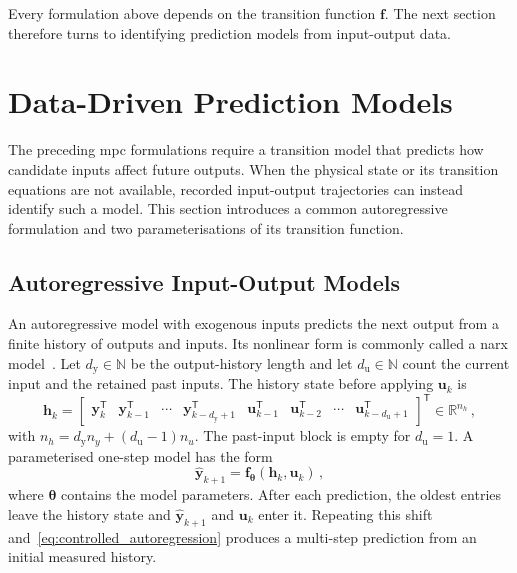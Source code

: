 Every formulation above depends on the transition function $\mathbf{f}$. The next section
therefore turns to identifying prediction models from input-output data.

\section{Data-Driven Prediction Models}
\label{sec:sysid}

The preceding \ac{mpc} formulations require a transition model that predicts how candidate
inputs affect future outputs. When the physical state or its transition equations are not
available, recorded input-output trajectories can instead identify such a model. This section
introduces a common autoregressive formulation and two parameterisations of its transition
function.

\subsection{Autoregressive Input-Output Models}

An autoregressive model with exogenous inputs predicts the next output from a finite history
of outputs and inputs. Its nonlinear form is commonly called a \ac{narx} model~\cite{Chen1989}. %
Let $d_\mathrm{y} \in \mathbb{N}$ be the output-history length and let
$d_\mathrm{u} \in \mathbb{N}$ count the current input and the retained past inputs. The
history state before applying $\mathbf{u}_k$ is
%
\begin{equation}
    \mathbf{h}_k
    = \begin{bmatrix}
        \mathbf{y}_k^\mathsf{T} & \mathbf{y}_{k-1}^\mathsf{T} & \cdots &
        \mathbf{y}_{k-d_\mathrm{y}+1}^\mathsf{T} &
        \mathbf{u}_{k-1}^\mathsf{T} & \mathbf{u}_{k-2}^\mathsf{T} & \cdots &
        \mathbf{u}_{k-d_\mathrm{u}+1}^\mathsf{T}
      \end{bmatrix}^\mathsf{T}
    \in \mathbb{R}^{n_h} \,,
    \label{eq:history_state}
\end{equation}
%
with $n_h = d_\mathrm{y}n_y + (d_\mathrm{u}-1)n_u$. The past-input block is empty for $d_\mathrm{u}=1$. A parameterised one-step model has
the form
%
\begin{equation}
    \hat{\mathbf{y}}_{k+1}
    = \mathbf{f}_{\boldsymbol{\theta}}\!\left(\mathbf{h}_k,\mathbf{u}_k\right) \,,
    \label{eq:controlled_autoregression}
\end{equation}
%
where $\boldsymbol{\theta}$ contains the model parameters. After each prediction, the oldest
entries leave the history state and $\hat{\mathbf{y}}_{k+1}$ and $\mathbf{u}_k$ enter it. Repeating
this shift and~\eqref{eq:controlled_autoregression} produces a multi-step prediction from an
initial measured history.


